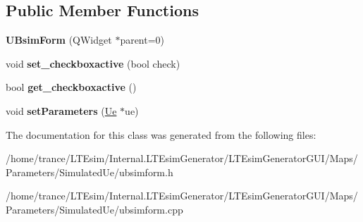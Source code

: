 \subsection*{Public Member Functions}
\begin{DoxyCompactItemize}
\item 
{\bfseries U\+Bsim\+Form} (Q\+Widget $\ast$parent=0)\hypertarget{class_u_bsim_form_a9ca48a4005c0c9b5485de5d20e555b23}{}\label{class_u_bsim_form_a9ca48a4005c0c9b5485de5d20e555b23}

\item 
void {\bfseries set\+\_\+checkboxactive} (bool check)\hypertarget{class_u_bsim_form_ab327b9cfd3d4244980873a7f1dbec3d8}{}\label{class_u_bsim_form_ab327b9cfd3d4244980873a7f1dbec3d8}

\item 
bool {\bfseries get\+\_\+checkboxactive} ()\hypertarget{class_u_bsim_form_a39251f5f8d2359c75443f2f638b55d3b}{}\label{class_u_bsim_form_a39251f5f8d2359c75443f2f638b55d3b}

\item 
void {\bfseries set\+Parameters} (\hyperlink{class_ue}{Ue} $\ast$ue)\hypertarget{class_u_bsim_form_af76b059a7b7509705aa93a83ed3b01ce}{}\label{class_u_bsim_form_af76b059a7b7509705aa93a83ed3b01ce}

\end{DoxyCompactItemize}


The documentation for this class was generated from the following files\+:\begin{DoxyCompactItemize}
\item 
/home/trance/\+L\+T\+Esim/\+Internal.\+L\+T\+Esim\+Generator/\+L\+T\+Esim\+Generator\+G\+U\+I/\+Maps/\+Parameters/\+Simulated\+Ue/ubsimform.\+h\item 
/home/trance/\+L\+T\+Esim/\+Internal.\+L\+T\+Esim\+Generator/\+L\+T\+Esim\+Generator\+G\+U\+I/\+Maps/\+Parameters/\+Simulated\+Ue/ubsimform.\+cpp\end{DoxyCompactItemize}
